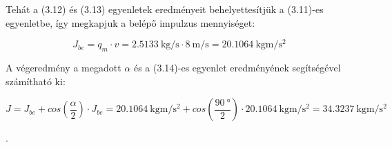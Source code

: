 \noindent Tehát a (3.12) és (3.13) egyenletek eredményeit behelyettesítjük a (3.11)-es egyenletbe, így megkapjuk a belépő impulzus mennyiséget:

\begin{equation}
J_{be}=q_m\cdot{v}=\SI{2,5133}{\kilo\gram\per\second}\cdot{\SI{8}{\meter\per\second}}=\SI{20,1064}{\kilo\gram\meter\per\second\squared}
\end{equation}

\noindent A végeredmény a megadott $\alpha$ és a (3.14)-es egyenlet eredményének segítségével számítható ki:

\begin{equation}
J=J_{be}+{cos\left(\frac{\alpha}{2}\right)}\cdot{J_{be}}=\SI{20,1064}{\kilo\gram\meter\per\second\squared}+{cos\left(\frac{\SI{90}{\degree}}{2}\right)}\cdot{\SI{20,1064}{\kilo\gram\meter\per\second\squared}=\SI{34,3237}{\kilo\gram\meter\per\second\squared}}
\end{equation}


\noindent{}.

\pagebreak
